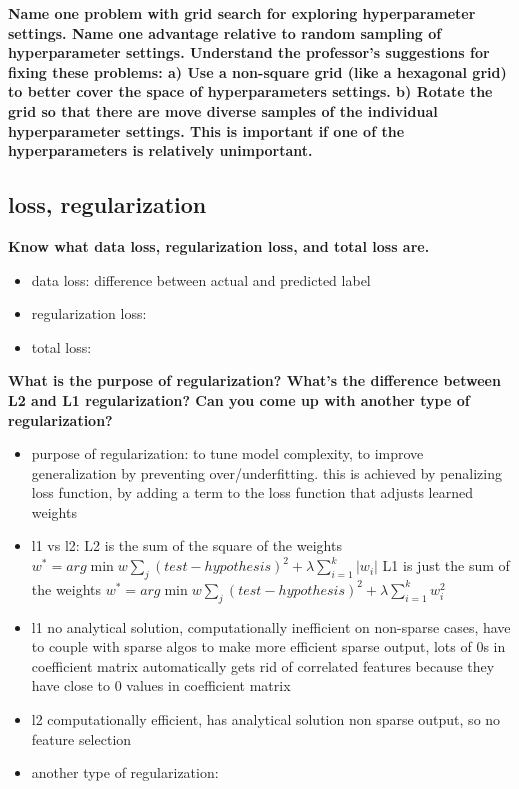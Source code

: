 \documentclass[10pt,letterpaper]{article}
\begin{document}
\subitem \textbf{ Name one problem with grid search for exploring hyperparameter settings. Name one advantage relative to random sampling of hyperparameter settings. Understand the professor’s suggestions for fixing these problems: 
\subsubitem  a) Use a non-square grid (like a hexagonal grid) to better cover the space of hyperparameters settings.
\subsubitem  b) Rotate the grid so that there are move diverse samples of the individual hyperparameter settings. This is important if one of the hyperparameters is relatively unimportant.}
\begin{solution}
\end{solution}


\subsection{loss, regularization}

\subitem \textbf{ Know what data loss, regularization loss, and total loss are.}
\begin{solution}
\begin{itemize}
\item data loss: difference between actual and predicted label 
\item regularization loss: 
\item total loss:
\end{itemize}
\end{solution}

\subitem \textbf{ What is the purpose of regularization? What’s the difference between L2 and L1 regularization? Can you come up with another type of regularization?}
\begin{solution}
\begin{itemize}
\item purpose of regularization: to tune model complexity, to improve generalization by preventing over/underfitting. this is achieved by penalizing loss function, by adding a term to the loss function that adjusts learned weights
\item l1 vs l2: 
\subitem L2 is the sum of the square of the weights 
\subitem $w^* = arg\min{w}\sum_j{(test - hypothesis)^2} + \lambda \sum\limits_{i=1}^k{|w_i|}$
\subitem L1 is just the sum of the weights 
\subitem $w^* = arg\min{w}\sum_j{(test - hypothesis)^2} + \lambda \sum\limits_{i=1}^k{w_i^2}$
\item l1 no analytical solution, computationally inefficient on non-sparse cases, have to couple with sparse algos to make more efficient
\subitem sparse output, lots of 0s in coefficient matrix
\subitem automatically gets rid of correlated features because they have close to 0 values in coefficient matrix
\item l2 computationally efficient, has analytical solution
\subitem non sparse output, so no feature selection
\item another type of regularization:
\end{itemize}

\end{solution}
\end{document}
